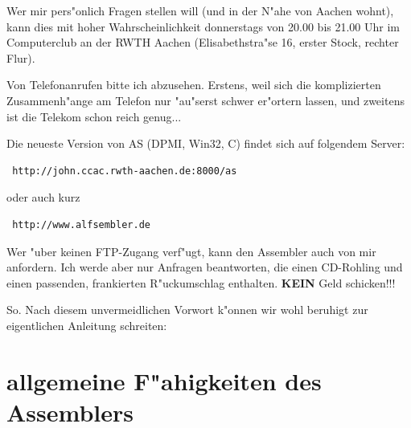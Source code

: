 \documentclass[12pt,a4paper,twoside]{report}
\newcommand{\bb}[1]{{\bf #1}}
\newcommand{\asname}{AS}
\begin{document}
Wer mir pers"onlich Fragen stellen will (und in der N"ahe von Aachen
wohnt), kann dies mit hoher Wahrscheinlichkeit donnerstags von 20.00
bis 21.00 Uhr im Computerclub an der RWTH Aachen (Elisabethstra"se 16,
erster Stock, rechter Flur).
\par
Von Telefonanrufen bitte ich abzusehen.  Erstens, weil sich die
komplizierten Zusammenh"ange am Telefon nur "au"serst schwer er"ortern
lassen, und zweitens ist die Telekom schon reich genug...
\par
Die neueste Version von \asname{} (DPMI, Win32, C) findet sich auf folgendem
Server:
\begin{verbatim}
 http://john.ccac.rwth-aachen.de:8000/as
\end{verbatim}
oder auch kurz
\begin{verbatim}
 http://www.alfsembler.de
\end{verbatim}
\par
Wer "uber keinen FTP-Zugang verf"ugt, kann den Assembler auch von mir
anfordern.  Ich werde aber nur Anfragen beantworten, die einen CD-Rohling
und einen passenden, frankierten R"uckumschlag enthalten.  \bb{KEIN} Geld
schicken!!!
\par
So. Nach diesem unvermeidlichen Vorwort k"onnen wir wohl beruhigt
zur eigentlichen Anleitung schreiten:


\section{allgemeine F"ahigkeiten des Assemblers}
\end{document}
